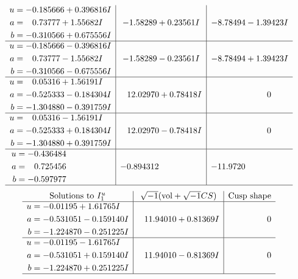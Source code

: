 \documentclass[1p]{elsarticle_modified}
\theoremstyle{definition}
\newcommand{\I}{\sqrt{-1}}
\begin{document}
$$\begin{array}{c|c|c}
\begin{aligned}
u &= -0.185666 + 0.396816 I \\
a &= \phantom{-}0.73777 + 1.55682 I \\
b &= -0.310566 + 0.675556 I\end{aligned}
 & -1.58289 + 0.23561 I & -8.78494 - 1.39423 I \\ \hline\begin{aligned}
u &= -0.185666 - 0.396816 I \\
a &= \phantom{-}0.73777 - 1.55682 I \\
b &= -0.310566 - 0.675556 I\end{aligned}
 & -1.58289 - 0.23561 I & -8.78494 + 1.39423 I \\ \hline\begin{aligned}
u &= \phantom{-}0.05316 + 1.56191 I \\
a &= -0.525333 - 0.184304 I \\
b &= -1.304880 - 0.391759 I\end{aligned}
 & \phantom{-}12.02970 + 0.78418 I & \phantom{-0.000000 } 0 \\ \hline\begin{aligned}
u &= \phantom{-}0.05316 - 1.56191 I \\
a &= -0.525333 + 0.184304 I \\
b &= -1.304880 + 0.391759 I\end{aligned}
 & \phantom{-}12.02970 - 0.78418 I & \phantom{-0.000000 } 0 \\ \hline\begin{aligned}
u &= -0.436484\phantom{ +0.000000I} \\
a &= \phantom{-}0.725456\phantom{ +0.000000I} \\
b &= -0.597977\phantom{ +0.000000I}\end{aligned}
 & -0.894312\phantom{ +0.000000I} & -11.9720\phantom{ +0.000000I}\\
 \hline 
 \end{array}$$\newpage$$\begin{array}{c|c|c}  
\text{Solutions to }I^u_{1}& \I (\text{vol} + \sqrt{-1}CS) & \text{Cusp shape}\\
 \hline 
\begin{aligned}
u &= -0.01195 + 1.61765 I \\
a &= -0.531051 - 0.159140 I \\
b &= -1.224870 - 0.251225 I\end{aligned}
 & \phantom{-}11.94010 + 0.81369 I & \phantom{-0.000000 } 0 \\ \hline\begin{aligned}
u &= -0.01195 - 1.61765 I \\
a &= -0.531051 + 0.159140 I \\
b &= -1.224870 + 0.251225 I\end{aligned}
 & \phantom{-}11.94010 - 0.81369 I & \phantom{-0.000000 } 0\\
 \hline 
 \end{array}$$\newpage\newpage\renewcommand{\arraystretch}{1}
\end{document}
